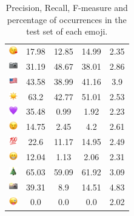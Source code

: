 \documentclass{article}
\begin{document}
\begin{table}
\begin{tabular}{|c|ccc|c|}
\includegraphics[height=0.37cm,width=0.37cm]{img/face_blowing_a_kiss.png} & 17.98 & 12.85 & 14.99 & 2.35\\ 
\includegraphics[height=0.37cm,width=0.37cm]{img/camera.png} & 31.19 & 48.67 & 38.01 & 2.86\\ 
\includegraphics[height=0.37cm,width=0.37cm]{img/United_States.png} & 43.58 & 38.99 & 41.16 & 3.9\\ 
\includegraphics[height=0.37cm,width=0.37cm]{img/sun.png} & 63.2 & 42.77 & 51.01 & 2.53\\ 
\includegraphics[height=0.37cm,width=0.37cm]{img/purple_heart.png} & 35.48 & 0.99 & 1.92 & 2.23\\ 
\includegraphics[height=0.37cm,width=0.37cm]{img/winking_face.png} & 14.75 & 2.45 & 4.2 & 2.61\\ 
\includegraphics[height=0.37cm,width=0.37cm]{img/hundred_points.png} & 22.6 & 11.17 & 14.95 & 2.49\\ 
\includegraphics[height=0.37cm,width=0.37cm]{img/beaming_face_with_smiling_eyes.png} & 12.04 & 1.13 & 2.06 & 2.31\\ 
\includegraphics[height=0.37cm,width=0.37cm]{img/Christmas_tree.png} & 65.03 & 59.09 & 61.92 & 3.09\\ 
\includegraphics[height=0.37cm,width=0.37cm]{img/camera_with_flash.png} & 39.31 & 8.9 & 14.51 & 4.83\\ 
\includegraphics[height=0.37cm,width=0.37cm]{img/winking_face_with_tongue.png} & 0.0 & 0.0 & 0.0 & 2.02\\ 

\hline
\end{tabular}
\caption{\label{table:emoji_detailed} Precision, Recall, F-measure and percentage of occurrences in the test set of each emoji.}
\end{table}
\end{document}
